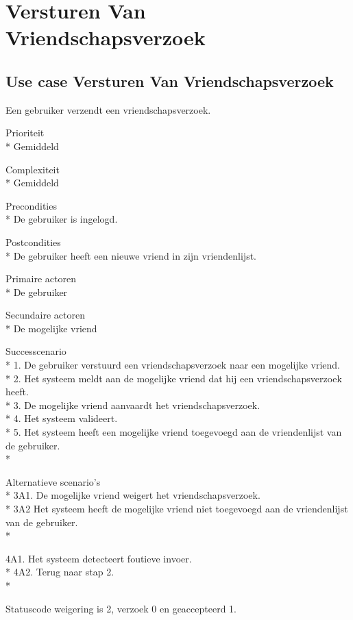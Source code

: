 \documentclass[pdftex,a4paper,12pt,twoside]{report}
\begin{document}
\newpage
\section{Versturen Van Vriendschapsverzoek}
\subsection{Use case Versturen Van Vriendschapsverzoek}
Een gebruiker verzendt een vriendschapsverzoek.

Prioriteit\\*
Gemiddeld

Complexiteit\\*
Gemiddeld

Precondities \\*
De gebruiker is ingelogd.

Postcondities \\*
De gebruiker heeft een nieuwe vriend in zijn vriendenlijst.

Primaire actoren \\*
De gebruiker

Secundaire actoren \\*
De mogelijke vriend

Successcenario\\*
1. De gebruiker verstuurd een vriendschapsverzoek naar een mogelijke vriend.\\*
2. Het systeem meldt aan de mogelijke vriend dat hij een vriendschapsverzoek heeft.\\*
3. De mogelijke vriend aanvaardt het vriendschapsverzoek.\\*
4. Het systeem valideert.\\*
5. Het systeem heeft een mogelijke vriend toegevoegd aan de vriendenlijst van de gebruiker.\\*

Alternatieve scenario’s\\*
3A1. De mogelijke vriend weigert het vriendschapsverzoek.\\*
3A2 Het systeem heeft de mogelijke vriend niet toegevoegd aan de vriendenlijst van de gebruiker.\\*

4A1. Het systeem detecteert foutieve invoer.\\*
4A2. Terug naar stap 2.\\*

Statuscode weigering is 2, verzoek 0 en geaccepteerd 1.
\end{document}
